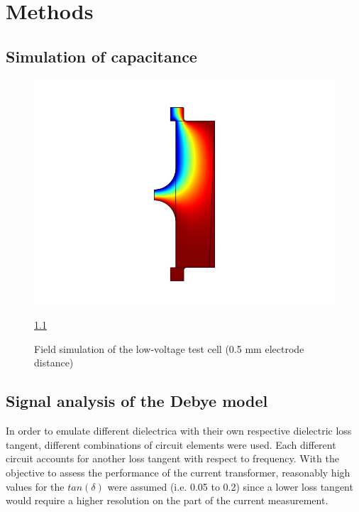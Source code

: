 \chapter{Methods}

\section{Simulation of capacitance} \label{sec.analysecurrent}

\begin{figure}[htbp]
	\centering
	\includegraphics{figures/COMSOL_Beispielbild.jpg}		
	\caption[Kurze Abbildungsbeschreibung]{Field simulation of the low-voltage test cell (0.5 mm electrode distance)} \ref{sec.analysecurrent}
	\label{fig.waveforms}
\end{figure}


\section{Signal analysis of the Debye model}

In order to emulate different dielectrica with their own respective dielectric loss tangent, different combinations of circuit elements were used. Each different circuit accounts for another loss tangent with respect to frequency. With the objective to assess the performance of the current transformer, reasonably high values for the $tan\left(\delta\right)$ were assumed (i.e. 0.05 to 0.2) since a lower loss tangent would require a higher resolution on the part of the current measurement.


